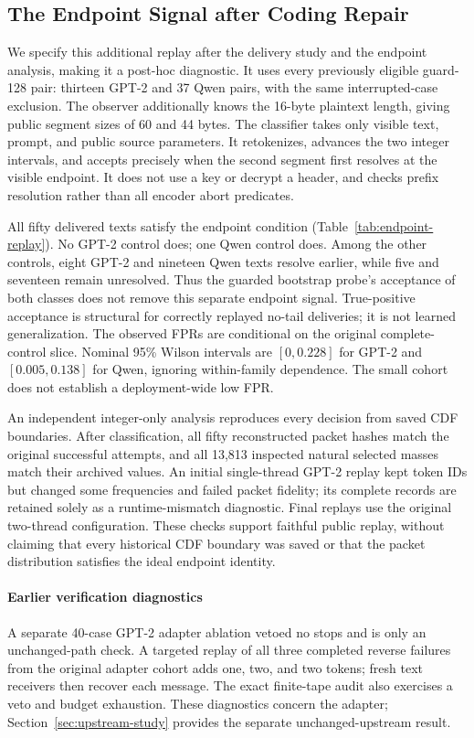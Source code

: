 \subsection{The Endpoint Signal after Coding Repair}
\label{sec:endpoint-replay}

We specify this additional replay after the delivery study and the endpoint
analysis, making it a post-hoc diagnostic. It uses every previously eligible
guard-128 pair: thirteen GPT-2 and 37 Qwen pairs, with the same interrupted-case
exclusion. The observer additionally knows the 16-byte plaintext length,
giving public segment sizes of 60 and 44 bytes. The classifier takes only
visible text, prompt, and public source parameters. It retokenizes, advances
the two integer intervals, and accepts precisely when the second segment first resolves
at the visible endpoint. It does not use a key or decrypt a header, and checks
prefix resolution rather than all encoder abort predicates.



All fifty delivered texts satisfy the endpoint condition
(Table~\ref{tab:endpoint-replay}). No GPT-2 control does; one Qwen control does.
Among the other controls, eight GPT-2 and nineteen Qwen texts resolve earlier,
while five and seventeen remain unresolved. Thus the guarded bootstrap probe's
acceptance of both classes does not remove this separate endpoint signal.
True-positive acceptance is structural for correctly replayed no-tail
deliveries; it is not learned generalization. The observed FPRs are conditional
on the original complete-control slice. Nominal 95\% Wilson intervals are
$[0,0.228]$ for GPT-2 and $[0.005,0.138]$ for Qwen, ignoring within-family
dependence. The small cohort does not establish a deployment-wide low FPR.

An independent integer-only analysis reproduces every decision from saved CDF
boundaries. After classification, all fifty reconstructed packet hashes match
the original successful attempts, and all 13,813 inspected natural selected
masses match their archived values. An initial single-thread GPT-2 replay kept
token IDs but changed some frequencies and failed packet fidelity; its complete
records are retained solely as a runtime-mismatch diagnostic. Final replays
use the original two-thread configuration. These checks support faithful public
replay, without claiming that every historical CDF boundary was saved or that
the packet distribution satisfies the ideal endpoint identity.

\paragraph{Earlier verification diagnostics}
A separate 40-case GPT-2 adapter ablation vetoed no stops and is only an
unchanged-path check. A targeted replay of all three completed reverse failures
from the original adapter cohort adds one, two, and two tokens; fresh text
receivers then recover each message. The exact finite-tape audit also exercises
a veto and budget exhaustion. These diagnostics concern the adapter;
Section~\ref{sec:upstream-study} provides the separate unchanged-upstream result.
